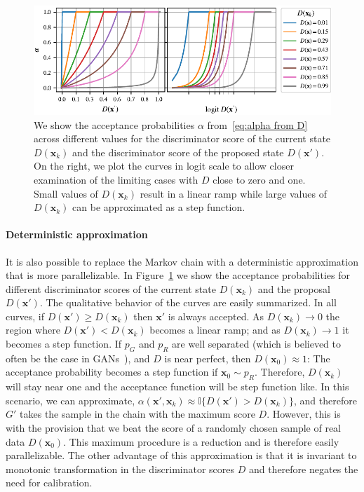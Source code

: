\documentclass{article}
\renewcommand{\vec}[1]{{\boldsymbol{\mathbf{#1}}}} %
\newcommand{\I}{\mathbb{I}}
\newcommand{\sample}{\sim}
\newcommand{\PG}{{p_G}}
\newcommand{\PR}{{p_R}}
\newcommand{\accept}{\alpha}
\begin{document}
\begin{figure}
    \centering
    \includegraphics[width=\textwidth]{figures/alpha2.pdf}
    \caption{{\small
    We show the acceptance probabilities $\accept$ from~\eqref{eq:alpha from D} across different values for the discriminator score of the current state $D(\vec x_k)$ and the discriminator score of the proposed state $D(\vec x')$.
    On the right, we plot the curves in logit scale to allow closer examination of the limiting cases with $D$ close to zero and one.
    Small values of $D(\vec x_k)$ result in a linear ramp while large values of $D(\vec x_k)$ can be approximated as a step function.
    }}
    \label{fig:alpha}
\end{figure}

\paragraph{Deterministic approximation}
It is also possible to replace the Markov chain with a deterministic approximation that is more parallelizable.
In Figure~\ref{fig:alpha} we show the acceptance probabilities for different discriminator scores of the current state $D(\vec x_k)$ and the proposal $D(\vec x')$.
The qualitative behavior of the curves are easily summarized.
In all curves, if $D(\vec x') \geq D(\vec x_k)$ then $\vec x'$ is always accepted.
As $D(\vec x_k) \rightarrow 0$ the region where $D(\vec x') < D(\vec x_k)$ becomes a linear ramp; and as $D(\vec x_k) \rightarrow 1$ it becomes a step function.
If $\PG$ and $\PR$ are well separated (which is believed to often be the case in GANs~\citep{Arjovsky2017}), and $D$ is near perfect, then $D(\vec x_0) \approx 1$: The acceptance probability becomes a step function if $\vec x_0 \sample \PR$.
Therefore, $D(\vec x_k)$ will stay near one and the acceptance function will be step function like.
In this scenario, we can approximate, $\accept(\vec x', \vec x_k) \approx \I\{D(\vec x') > D(\vec x_k)\}$, and therefore $G'$ takes the sample in the chain with the maximum score $D$.
However, this is with the provision that we beat the score of a randomly chosen sample of real data $D(\vec x_0)$.
This maximum procedure is a reduction and is therefore easily parallelizable.
The other advantage of this approximation is that it is invariant to monotonic transformation in the discriminator scores $D$ and therefore negates the need for calibration.
\end{document}
